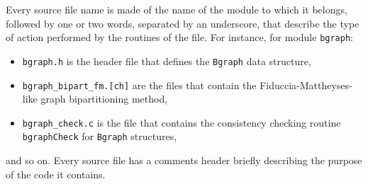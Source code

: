 Every source file name is made of the name of the module to which it
belongs, followed by one or two words, separated by an underscore,
that describe the type of action performed by the routines of the
file. For instance, for module \texttt{bgraph}:
\begin{itemize}
\item
\texttt{bgraph.h} is the header file that defines the \texttt{Bgraph}
data structure,
\item
\texttt{bgraph\_bipart\_fm.[ch]} are the files that contain the
Fiduccia-Mattheyses-like graph bipartitioning method,
\item
\texttt{bgraph\_check.c} is the file that contains the consistency
checking routine \texttt{bgraph\lbt Check} for \texttt{Bgraph}
structures,
\end{itemize}
and so on. Every source file has a comments header briefly describing
the purpose of the code it contains.

